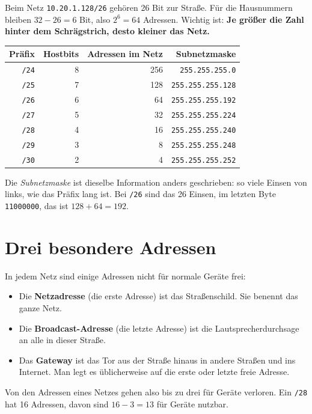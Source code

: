 \documentclass[a4paper,12pt, twoside]{report}
\theoremstyle{definition}
\begin{document}
Beim Netz \texttt{10.20.1.128/26} gehören 26 Bit zur Straße. Für die Hausnummern bleiben $32-26 = 6$ Bit, also $2^6 = 64$ Adressen. Wichtig ist: \textbf{Je größer die Zahl hinter dem Schrägstrich, desto kleiner das Netz.}

\begin{center}
\begin{tabular}{rrrr}
\toprule
Präfix & Hostbits & Adressen im Netz & Subnetzmaske \\
\midrule
\texttt{/24} & 8 & 256 & \texttt{255.255.255.0} \\
\texttt{/25} & 7 & 128 & \texttt{255.255.255.128} \\
\texttt{/26} & 6 & 64 & \texttt{255.255.255.192} \\
\texttt{/27} & 5 & 32 & \texttt{255.255.255.224} \\
\texttt{/28} & 4 & 16 & \texttt{255.255.255.240} \\
\texttt{/29} & 3 & 8 & \texttt{255.255.255.248} \\
\texttt{/30} & 2 & 4 & \texttt{255.255.255.252} \\
\bottomrule
\end{tabular}
\end{center}

Die \emph{Subnetzmaske} ist dieselbe Information anders geschrieben: so viele Einsen von links, wie das Präfix lang ist. Bei \texttt{/26} sind das 26 Einsen, im letzten Byte \texttt{11000000}, das ist $128 + 64 = 192$.

\section{Drei besondere Adressen}

In jedem Netz sind einige Adressen nicht für normale Geräte frei:
\begin{itemize}
	\item Die \textbf{Netzadresse} (die erste Adresse) ist das Straßenschild. Sie benennt das ganze Netz.
	\item Die \textbf{Broadcast-Adresse} (die letzte Adresse) ist die Lautsprecherdurchsage \glqq an alle in dieser Straße\grqq.
	\item Das \textbf{Gateway} ist das Tor aus der Straße hinaus in andere Straßen und ins Internet. Man legt es üblicherweise auf die erste oder letzte freie Adresse.
\end{itemize}
Von den Adressen eines Netzes gehen also bis zu drei für Geräte verloren. Ein \texttt{/28} hat 16 Adressen, davon sind $16 - 3 = 13$ für Geräte nutzbar.
\end{document}
